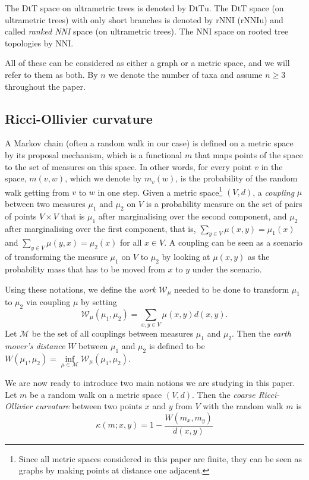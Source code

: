 \documentclass{amsart}
\newcommand{\nni}{\mathrm{NNI}}
\newcommand{\rnni}{\mathrm{rNNI}}
\newcommand{\rnniu}{\mathrm{rNNIu}}
\newcommand{\mdts}{\mathrm{DtT}}
\newcommand{\mdtsu}{\mathrm{DtTu}}
\newcommand{\W}{\mathcal{W}}
\newcommand{\M}{\mathcal{M}}
\begin{document}
The $\mdts$ space on ultrametric trees is denoted by $\mdtsu$.
The $\mdts$ space (on ultrametric trees) with only short branches is denoted by $\rnni$ ($\rnniu$) and called {\em ranked NNI} space (on ultrametric trees).
The NNI space on rooted tree topologies by $\nni$.

All of these can be considered as either a graph or a metric space, and we will refer to them as both.
By $n$ we denote the number of taxa and assume $n \geq 3$ throughout the paper.


\subsection{Ricci-Ollivier curvature}
A Markov chain (often a random walk in our case) is defined on a metric space by its proposal mechanism, which is a functional $m$ that maps points of the space to the set of measures on this space. 
In other words, for every point $v$ in the space, $m(v,w)$, which we denote by $m_v(w)$, is the probability of the random walk getting from $v$ to $w$ in one step.
Given a metric space\footnote{Since all metric spaces considered in this paper are finite, they can be seen as graphs by making points at distance one adjacent.} 
$(V,d)$, a \emph{coupling} $\mu$ between two measures $\mu_1$ and $\mu_2$ on $V$ is a probability measure on the set of pairs of points $V \times V$ that is $\mu_1$ after marginalising over the second component, and $\mu_2$ after marginalising over the first component, that is, $\sum\limits_{y \in V}\mu(x,y) = \mu_1(x)$ and $\sum\limits_{y \in V}\mu(y,x) = \mu_2(x)$ for all $x \in V$.
A coupling can be seen as a scenario of transforming the measure $\mu_1$ on $V$ to $\mu_2$ by looking at $\mu(x,y)$ as the probability mass that has to be moved from $x$ to $y$ under the scenario.

Using these notations, we define the {\em work} $\W_\mu$ needed to be done to transform $\mu_1$ to $\mu_2$ via coupling $\mu$ by setting
\[
\W_\mu(\mu_1,\mu_2) = \sum\limits_{x,y\in V}\mu(x,y) d(x,y).
\]
Let $\M$ be the set of all couplings between measures $\mu_1$ and $\mu_2$.
Then the {\em earth mover's distance} $W$ between $\mu_1$ and $\mu_2$ is defined to be $W(\mu_1,\mu_2) = \inf\limits_{\mu\in\M}\W_\mu(\mu_1,\mu_2)$.

We are now ready to introduce two main notions we are studying in this paper.
Let $m$ be a random walk on a metric space $(V,d)$.
Then the {\em coarse Ricci-Ollivier curvature} between two points $x$ and $y$ from $V$ with the random walk $m$ is
\[
\kappa(m;x,y) = 1 - \frac{W(m_x,m_y)}{d(x,y)}
\]
\end{document}
